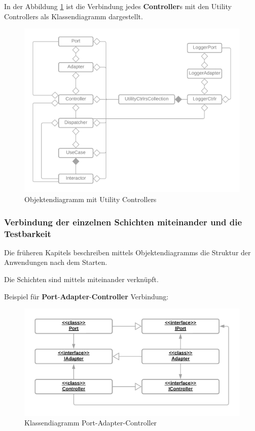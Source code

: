 \documentclass{article}
\begin{document}
    In der Abbildung \ref{fig:CDControllerWithUtility} ist die Verbindung jedes \textbf{Controller}s mit den Utility Controllers als Klassendiagramm dargestellt.
        
    \begin{figure}[H]
        \centering
        \includegraphics[width=12cm]{./images/KlassendiagramMitUtilityControllers.png}
         \caption[Objektendiagramm mit Utility Controllers]{Objektendiagramm mit Utility Controllers \footnotemark}
         \label{fig:CDControllerWithUtility}
    \end{figure}

    \subsubsection{Verbindung der einzelnen Schichten miteinander und die Testbarkeit}
    Die früheren Kapitels beschreiben mittels Objektendiagramms die Struktur der Anwendungen nach dem Starten.

    Die Schichten sind mittels \textbf{} miteinander verknüpft.

    Beispiel für \textbf{Port}-\textbf{Adapter}-\textbf{Controller} Verbindung:

    \begin{figure}[H]
        \centering
        \includegraphics[width=12cm]{./images/Klassendiagramm Port-Adapter.png}
        \caption[Klassendiagramm Port-Adapter-Controller]{Klassendiagramm Port-Adapter-Controller \footnotemark}
        \label{fig:FullCDPAC}
    \end{figure}
\end{document}
